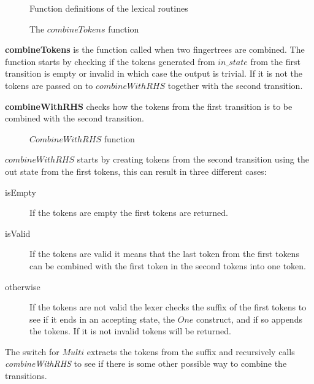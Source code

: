 \begin{figure}[h!]
  
  \caption{Function definitions of the lexical routines \label{fig:funheads}}
\end{figure}

\begin{figure}[h!]
  
  \caption{The $combineTokens$ function \label{fig:combinetoks}}
\end{figure}

\textbf{combineTokens} is the function called when two fingertrees are combined.
The function starts by checking if the tokens generated from $in\_state$ from
the first transition is empty or invalid in which case the output is trivial. If
it is not the tokens are passed on to $combineWithRHS$ together with the second
transition.

\textbf{combineWithRHS} checks how the tokens from the first
transition is to be combined with the second transition.

\begin{figure}[h!]
  
  \caption{$CombineWithRHS$ function\label{fig:cwrhs}}
\end{figure}

$combineWithRHS$ starts by creating tokens from the second transition using the
out state from the first tokens, this can result in three different cases:
\begin{description}
\item[isEmpty]If the tokens are empty the first tokens are returned.
\item[isValid]If the tokens are valid it means that the last token from the
first tokens can be combined with the first token in the second tokens into one
token.
\item[otherwise]If the tokens are not valid the lexer checks the suffix of the
first tokens to see if it ends in an accepting state, the $One$ construct, and
if so appends the tokens. If it is not invalid tokens will be returned.
\end{description}
The switch for $Multi$ extracts the tokens from the suffix and recursively calls
\emph{combineWithRHS} to see if there is some other possible way to combine the
transitions.

